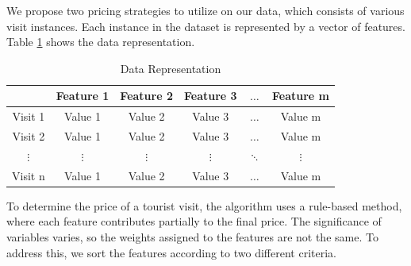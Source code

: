 \documentclass[12pt]{book}
\begin{document}
We propose two pricing strategies to utilize on our data, which consists of various visit instances. Each instance in the dataset is represented by a vector of features. Table \ref{tab:data} shows the data representation.
\begin{table}[h]
  \centering
  \begin{tabular}{cccccc}
    \hline
    & \textbf{Feature 1} & \textbf{Feature 2} & \textbf{Feature 3} & $\ldots$ & \textbf{Feature m}  \\
    \hline
    Visit 1 & Value 1   & Value 2   & Value 3   & $\ldots$ & Value m   \\
    Visit 2 & Value 1   & Value 2   & Value 3   & $\ldots$ & Value m   \\
    $\vdots$ & $\vdots$ & $\vdots$  & $\vdots$  & $\ddots$ & $\vdots$  \\
    Visit n & Value 1   & Value 2   & Value 3   & $\ldots$ & Value m   \\
    \hline
  \end{tabular}
  \caption{Data Representation}
  \label{tab:data}
\end{table}


To determine the price of a tourist visit, the algorithm uses a rule-based method, where each feature contributes partially to the final price. The significance of variables varies, so the weights assigned to the features are not the same. To address this, we sort the features according to two different criteria.
\end{document}
